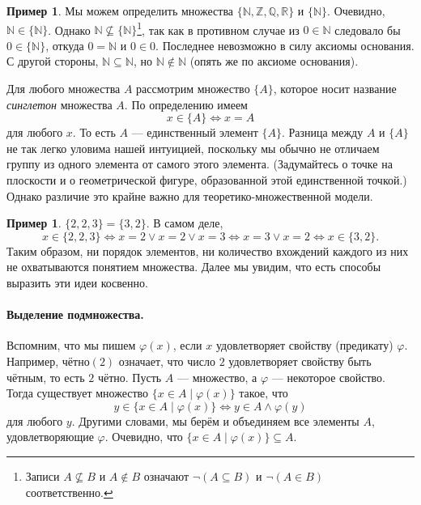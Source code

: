 \documentclass[12pt,notitlepage]{article}
\theoremstyle{plain}
\theoremstyle{definition}
\newtheorem{exm}[thm]{Пример}
\theoremstyle{plain}
\newcommand{\N}{\mathbb{N}}
\newcommand{\Z}{\mathbb{Z}}
\newcommand{\Q}{\mathbb{Q}}
\newcommand{\R}{\mathbb{R}}
\newcommand{\sbs}{\subseteq}
\renewcommand{\phi}{\varphi}
\newcommand{\1}{\mathbf{1}}
\newcommand{\0}{\mathbf{0}}
\newcommand{\mcomm}[1]{}
\begin{document}
\mcomm{Of course, there is no \emph{logical} necessity in turning the Axiom of Pairing into a schema for various $n \in \N$ as $\{a, b, c\} = \cup \{ \{a, b\}, \{ c, c \} \}$. Yet this observation uses the union essentially; so we have here preferred a freshman's comfort to logical elegance.}
\begin{exm}
	Мы можем определить множества $\{\N, \Z,\Q,\R\}$ и $\{ \N \}$. Очевидно, $\N \in \{\N\}$. Однако $\N \not \sbs \{\N\}$\footnote{Записи $A \not\sbs B$ и $A \notin B$ означают $\neg (A \sbs B)$ и $\neg (A \in B)$ соответственно.}, так как в противном случае из $0 \in \N$ следовало бы $0 \in \{\N\}$, откуда $0 = \N$ и $0 \in 0$. Последнее невозможно в силу аксиомы основания. С другой стороны, $\N \sbs \N$, но $\N \notin \N$ (опять же по аксиоме основания).
\end{exm}

Для любого множества $A$ рассмотрим множество $\{A\}$, которое носит название \emph{синглетон} множества $A$. По определению имеем
$$x \in \{ A \} \iff x = A$$
для любого $x$. То есть $A$ --- единственный элемент $\{ A \}$. Разница между $A$ и $\{A\}$ не так легко уловима нашей интуицией, поскольку мы обычно не отличаем группу из одного элемента от самого этого элемента. (Задумайтесь о точке на плоскости и о геометрической фигуре, образованной этой единственной точкой.) Однако различие это крайне важно для теоретико-множественной модели.

\begin{exm}
	$\{2,2,3\} = \{3,2\}$. В самом деле, 
	$$x \in \{2,2,3\} \iff x = 2 \vee x = 2 \vee x = 3 \iff x = 3 \vee x = 2 \iff x \in \{3,2\}.$$
	Таким образом, ни порядок элементов, ни количество вхождений каждого из них не охватываются понятием множества. Далее мы увидим, что есть способы выразить эти идеи косвенно.
\end{exm}

\paragraph{Выделение подмножества.} Вспомним, что мы пишем $\phi(x)$, если $x$ удовлетворяет свойству (предикату) $\phi$. Например, $\mbox{чётно}(2)$ означает, что число $2$ удовлетворяет свойству быть чётным, то есть $2$ чётно. Пусть $A$ --- множество, а $\phi$ --- некоторое свойство. Тогда существует множество $\{ x \in A \mid \phi(x) \}$ такое, что
$$y \in \{ x \in A \mid \phi(x) \} \iff y \in A \wedge \phi(y)$$
для любого $y$. Другими словами, мы берём и объединяем все элементы $A$, удовлетворяющие $\phi$.  Очевидно, что $\{ x \in A \mid \phi(x) \} \sbs A$.
\end{document}
